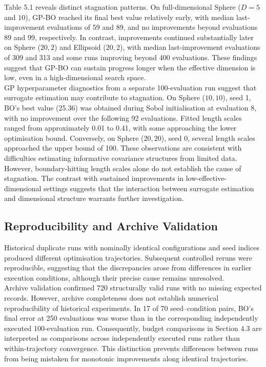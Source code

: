 \documentclass[11pt]{article}
\begin{document}
\noindent Table 5.1 reveals distinct stagnation patterns. On full-dimensional Sphere ($D = 5$ and $10$), GP-BO reached its final best value relatively early, with median last-improvement evaluations of 59 and 89, and no improvements beyond evaluations 89 and 99, respectively. In contrast, improvements continued substantially later on Sphere ($20,2$) and Ellipsoid ($20,2$), with median last-improvement evaluations of 309 and 313 and some runs improving beyond 400 evaluations. These findings suggest that GP-BO can sustain progress longer when the effective dimension is low, even in a high-dimensional search space.\\

\noindent GP hyperparameter diagnostics from a separate 100-evaluation run suggest that surrogate estimation may contribute to stagnation. On Sphere ($10,10$), seed 1, BO's best value (25.36) was obtained during Sobol initialisation at evaluation 8, with no improvement over the following 92 evaluations. Fitted length scales ranged from approximately 0.01 to 0.41, with some approaching the lower optimisation bound. Conversely, on Sphere ($20,20$), seed 0, several length scales approached the upper bound of 100. These observations are consistent with difficulties estimating informative covariance structures from limited data. However, boundary-hitting length scales alone do not establish the cause of stagnation. The contrast with sustained improvements in low-effective-dimensional settings suggests that the interaction between surrogate estimation and dimensional structure warrants further investigation.

\subsection{Reproducibility and Archive Validation}
Historical duplicate runs with nominally identical configurations and seed indices produced different optimisation trajectories. Subsequent controlled reruns were reproducible, suggesting that the discrepancies arose from differences in earlier execution conditions, although their precise cause remains unresolved. \\

\noindent Archive validation confirmed 720 structurally valid runs with no missing expected records. However, archive completeness does not establish numerical reproducibility of historical experiments. In 17 of 70 seed–condition pairs, BO's final error at 250 evaluations was worse than in the corresponding independently executed 100-evaluation run. Consequently, budget comparisons in Section 4.3 are interpreted as comparisons across independently executed runs rather than within-trajectory convergence. This distinction prevents differences between runs from being mistaken for monotonic improvements along identical trajectories.
\end{document}
